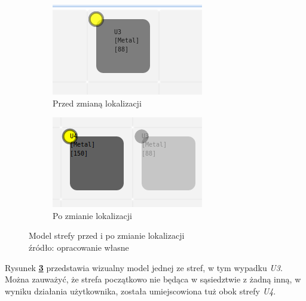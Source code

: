 		\begin{figure}[H]
			\centering  
			\begin{subfigure}[b]{0.4\textwidth}
                \centering
                \includegraphics[width=\textwidth]{images/app/unit_before_move}
                \caption{
                	Przed zmianą lokalizacji
				}
			\label{c7:fig:app:unit_before_move}
       		\end{subfigure}
			\begin{subfigure}[b]{0.4\textwidth}
                \centering
                \includegraphics[width=\textwidth]{images/app/unit_after_move}
                \caption{
               		Po zmianie lokalizacji
                }
			\label{c7:fig:app:unit_after_move}
       		\end{subfigure}
       		\caption[Aplikacja - Modelowanie struktury magazynu]{
       			Model strefy przed i po zmianie lokalizacji \\
					źródło: opracowanie własne
				}
			\label{c7:fig:app:unit_modelling}
		\end{figure} 
		Rysunek \textbf{\ref{c7:fig:app:unit_modelling}} przedstawia wizualny model jednej ze stref, 
		w tym wypadku \textit{U3}. Można zauważyć, że strefa początkowo nie będąca w sąsiedztwie z
		żadną inną, w wyniku działania użytkownika, została umiejscowiona tuż obok strefy \textit{U4}.
		
